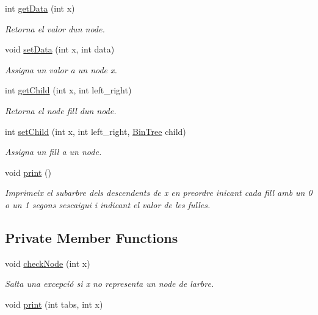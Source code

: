 \begin{DoxyCompactItemize}
int \hyperlink{classdomini_1_1utils_1_1BinTree_ad8734786aa8ba40815e4b782264aef64}{get\+Data} (int x)
\begin{DoxyCompactList}\small\item\em Retorna el valor d\textquotesingle{}un node. \end{DoxyCompactList}\item 
void \hyperlink{classdomini_1_1utils_1_1BinTree_a785c86fc21b251e2252455ab4ec2b3e1}{set\+Data} (int x, int data)
\begin{DoxyCompactList}\small\item\em Assigna un valor a un node x. \end{DoxyCompactList}\item 
int \hyperlink{classdomini_1_1utils_1_1BinTree_aee1ed36b9433869f94a6ee8a6815d872}{get\+Child} (int x, int left\+\_\+right)
\begin{DoxyCompactList}\small\item\em Retorna el node fill d\textquotesingle{}un node. \end{DoxyCompactList}\item 
int \hyperlink{classdomini_1_1utils_1_1BinTree_adbbdac6bb04a03f8f13c9152940ebbc6}{set\+Child} (int x, int left\+\_\+right, \hyperlink{classdomini_1_1utils_1_1BinTree}{Bin\+Tree} child)
\begin{DoxyCompactList}\small\item\em Assigna un fill a un node. \end{DoxyCompactList}\item 
void \hyperlink{classdomini_1_1utils_1_1BinTree_a0dc4daeb2d0e221cc8fc702d1d0ec795}{print} ()
\begin{DoxyCompactList}\small\item\em Imprimeix el subarbre dels descendents de x en preordre inicant cada fill amb un 0 o un 1 segons s\textquotesingle{}escaigui i indicant el valor de les fulles. \end{DoxyCompactList}\end{DoxyCompactItemize}
\subsection*{Private Member Functions}
\begin{DoxyCompactItemize}
\item 
void \hyperlink{classdomini_1_1utils_1_1BinTree_a32b3e2ad7dfee3425e0b1f6f8b5100f5}{check\+Node} (int x)
\begin{DoxyCompactList}\small\item\em Salta una excepció si x no representa un node de l\textquotesingle{}arbre. \end{DoxyCompactList}\item 
void \hyperlink{classdomini_1_1utils_1_1BinTree_a47c913594a3116b2e602c87fa4afc5c3}{print} (int tabs, int x)
\end{DoxyCompactItemize}
